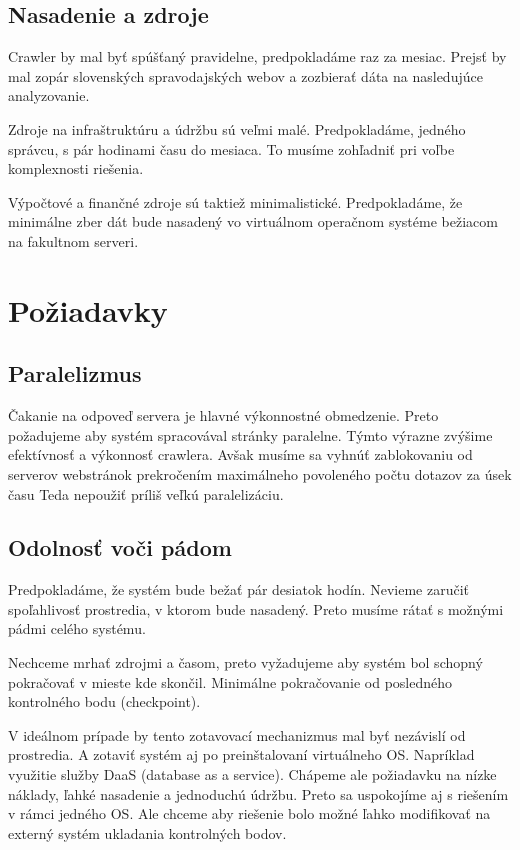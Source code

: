 \subsection{Nasadenie a zdroje}
Crawler by mal byť spúšťaný pravidelne, predpokladáme raz za mesiac. Prejsť by mal zopár slovenských spravodajských webov a zozbierať dáta na nasledujúce analyzovanie. 

Zdroje na infraštruktúru a údržbu sú veľmi malé. Predpokladáme, jedného správcu, s pár hodinami času do mesiaca. To musíme zohľadniť pri voľbe komplexnosti riešenia. 

Výpočtové a finančné zdroje sú taktiež minimalistické. Predpokladáme, že minimálne zber dát bude nasadený vo virtuálnom operačnom systéme bežiacom na fakultnom serveri. 



\section{Požiadavky}

\subsection{Paralelizmus}\label{c:reqParalel}
Čakanie na odpoveď servera je hlavné výkonnostné obmedzenie. Preto požadujeme aby systém spracovával stránky paralelne. Týmto výrazne zvýšime efektívnosť a výkonnosť crawlera. Avšak musíme sa vyhnúť zablokovaniu od serverov webstránok prekročením maximálneho povoleného počtu dotazov za úsek času Teda nepoužiť príliš veľkú paralelizáciu. 

\subsection{Odolnosť voči pádom} \label{sec:reqFailRecovery}
Predpokladáme, že systém bude bežať pár desiatok hodín. Nevieme zaručiť spoľahlivosť prostredia, v ktorom bude nasadený. Preto musíme rátať s možnými pádmi celého systému. 

Nechceme mrhať zdrojmi a časom, preto vyžadujeme aby systém bol schopný pokračovať v mieste kde skončil. Minimálne pokračovanie od posledného kontrolného bodu (checkpoint).

V ideálnom prípade by tento zotavovací mechanizmus mal byť nezávislí od prostredia. A zotaviť systém aj po preinštalovaní virtuálneho OS. Napríklad využitie služby DaaS (database as a service). Chápeme ale požiadavku na nízke náklady, ľahké nasadenie a jednoduchú údržbu. Preto sa uspokojíme aj s riešením v rámci jedného OS. Ale chceme aby riešenie bolo možné ľahko modifikovať na externý systém ukladania kontrolných bodov.

